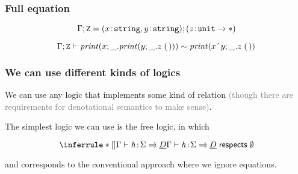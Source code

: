 \documentclass[usenames,dvipsnames]{beamer}
\begin{document}
\begin{frame}
  \frametitle{Full equation}
	\[{\Gamma};{\mathtt{Z}} = {(x \!:\! \texttt{string}, y \!:\! \texttt{string})};{(z \!:\! \mathtt{unit} \to \mathtt{*})}
	\]
	
	\[
    {{\Gamma};{\mathtt{Z}}}\vdash {
      \mathit{print}(x; \_.\mathit{print}(y; \_.{z}\;{\mathtt{(\,)}}))
      \sim\mathit{print}(x \;\hat{}\;y; \_.{z}\;{\mathtt{(\,)}})
      }
  \]
\end{frame}
\begin{frame}
	\frametitle{We can use different kinds of logics}
	We can use any logic that implements some kind of  relation \textcolor{gray}{(though there are requirements for denotational semantics to make sense)}.
	\vspace{5mm}
	
	The simplest logic we can use is the free logic, in which

	\[
	\inferrule*[]
	{ \welltyped{\hcases}{\sig \casesto \ctyD} }
	{ \respects{\hcases}{\nil}{\sig}{\ctyD} }
	\]

	and corresponds to the conventional approach where we ignore equations.
\end{frame}
\end{document}
